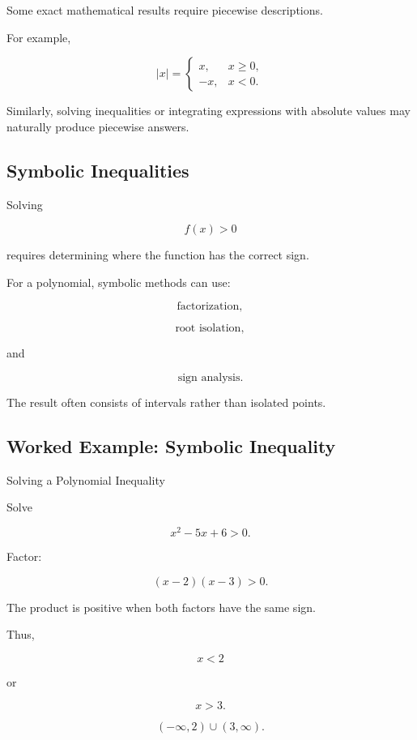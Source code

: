 Some exact mathematical results require piecewise descriptions.

For example,

\[
|x|
=
\boxed{
\begin{cases}
x,
&
x\geq0,
\\
-x,
&
x<0.
\end{cases}
}
\]

Similarly, solving inequalities or integrating expressions with absolute
values may naturally produce piecewise answers.

\subsection{Symbolic Inequalities}
\label{subsec:symbolic-inequalities}

Solving

\[
f(x)>0
\]

requires determining where the function has the correct sign.

For a polynomial, symbolic methods can use:

\[
\boxed{
\text{factorization},
}
\]

\[
\boxed{
\text{root isolation},
}
\]

and

\[
\boxed{
\text{sign analysis}.
}
\]

The result often consists of intervals rather than isolated points.

\subsection{Worked Example: Symbolic Inequality}
\label{subsec:worked-symbolic-inequality}

\begin{workedexamplebox}{Solving a Polynomial Inequality}

Solve

\[
x^2-5x+6>0.
\]

Factor:

\[
(x-2)(x-3)>0.
\]

The product is positive when both factors have the same sign.

Thus,

\[
x<2
\]

or

\[
x>3.
\]

\begin{answerbox}
\[
\boxed{
(-\infty,2)
\cup
(3,\infty).
}
\]
\end{answerbox}

\end{workedexamplebox}

